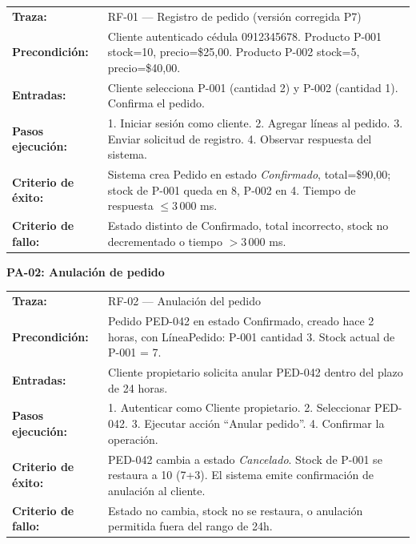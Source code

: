 \documentclass{article}
\begin{document}
\begin{tcolorbox}[colback=white, colframe=black, boxrule=0.5pt, sharp corners, 
  title={}, breakable]

\medskip
\begin{tabularx}{\linewidth}{@{}l X@{}}
\textbf{Traza:}              & RF-01 — Registro de pedido (versión corregida P7) \\
\textbf{Precondición:}       & Cliente autenticado cédula 0912345678. Producto P-001 stock=10, precio=\$25,00. Producto P-002 stock=5, precio=\$40,00. \\
\textbf{Entradas:}           & Cliente selecciona P-001 (cantidad 2) y P-002 (cantidad 1). Confirma el pedido. \\
\textbf{Pasos ejecución:}    & 1. Iniciar sesión como cliente. 2. Agregar líneas al pedido. 3. Enviar solicitud de registro. 4. Observar respuesta del sistema. \\
\textbf{Criterio de éxito:}  & Sistema crea Pedido en estado \textit{Confirmado}, total=\$90,00; stock de P-001 queda en 8, P-002 en 4. Tiempo de respuesta $\leq 3\,000$ ms. \\
\textbf{Criterio de fallo:}  & Estado distinto de Confirmado, total incorrecto, stock no decrementado o tiempo $> 3\,000$ ms. \\
\end{tabularx}
\end{tcolorbox}


\vspace{0.8cm}
\textbf{PA-02: Anulación de pedido}
\vspace{0.2cm}



\begin{tcolorbox}[colback=white, colframe=black, boxrule=0.5pt, sharp corners, 
  title={}, breakable]

\medskip
\begin{tabularx}{\linewidth}{@{}l X@{}}
\textbf{Traza:}              & RF-02 — Anulación del pedido \\
\textbf{Precondición:}       & Pedido PED-042 en estado Confirmado, creado hace 2 horas, con LíneaPedido: P-001 cantidad 3. Stock actual de P-001 = 7. \\
\textbf{Entradas:}           & Cliente propietario solicita anular PED-042 dentro del plazo de 24 horas. \\
\textbf{Pasos ejecución:}    & 1. Autenticar como Cliente propietario. 2. Seleccionar PED-042. 3. Ejecutar acción ``Anular pedido''. 4. Confirmar la operación. \\
\textbf{Criterio de éxito:}  & PED-042 cambia a estado \textit{Cancelado}. Stock de P-001 se restaura a 10 (7+3). El sistema emite confirmación de anulación al cliente. \\
\textbf{Criterio de fallo:}  & Estado no cambia, stock no se restaura, o anulación permitida fuera del rango de 24h. \\
\end{tabularx}
\end{tcolorbox}
\end{document}
